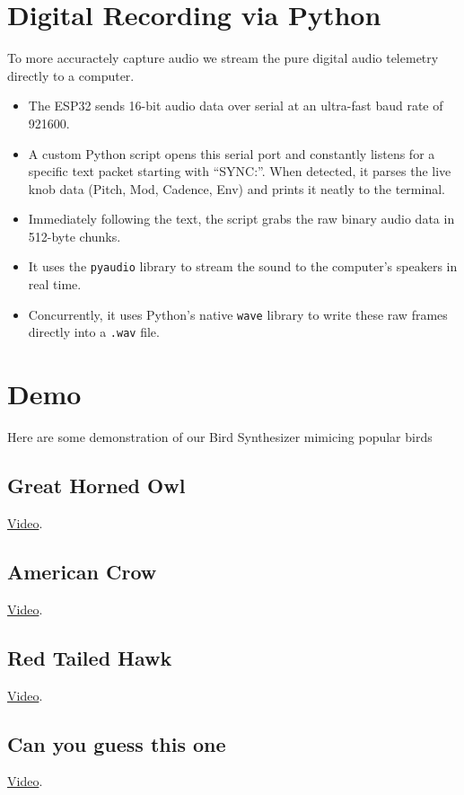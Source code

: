 \documentclass{article}
\begin{document}
\begin{center}
\end{center}

\section*{Digital Recording via Python}
To more accuractely capture audio we stream the pure digital audio telemetry directly to a computer. 

\begin{itemize}
    \item The ESP32 sends 16-bit audio data over serial at an ultra-fast baud rate of 921600.
    \item A custom Python script opens this serial port and constantly listens for a specific text packet starting with ``SYNC:''. When detected, it parses the live knob data (Pitch, Mod, Cadence, Env) and prints it neatly to the terminal.
    \item Immediately following the text, the script grabs the raw binary audio data in 512-byte chunks.
    \item It uses the \texttt{pyaudio} library to stream the sound to the computer's speakers in real time.
    \item Concurrently, it uses Python's native \texttt{wave} library to write these raw frames directly into a \texttt{.wav} file.  
\end{itemize}

\section*{Demo}
Here are some demonstration of our Bird Synthesizer mimicing popular birds
\subsection*{Great Horned Owl}
\href{https://youtu.be/du914pfOyX8}{Video}.
\subsection*{American Crow}
\href{https://youtu.be/UnQx-fNgLME}{Video}.
\subsection*{Red Tailed Hawk}
\href{https://youtu.be/X9xNjkKIluQ}{Video}.
\subsection*{Can you guess this one}
\href{https://youtu.be/KUNCZCRVAMI}{Video}.
\end{document}
